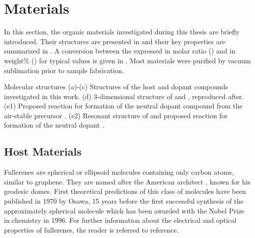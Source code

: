 \newpage
\section{Materials}\label{sec:Mat}
In this section, the organic materials investigated during this thesis are briefly introduced. Their structures are presented in  and their key properties are summarized in . A conversion between the \CLong expressed in molar ratio (\mr{}) and in weight\% (\wt{}) for typical values is given in . Most materials were purified by vacuum sublimation prior to sample fabrication.

{Molecular structures}
{(a)-(c) Structures of the host and dopant compounds investigated in this work. (d) 3-dimensional structure of \CrPd and \WPd, reproduced after\cite{Cotton2003}. (e1) Proposed reaction for formation of the neutral dopant compound \meodmbi from the air-stable precursor \meodmbiI. (e2) Resonant structure of \dmbi and proposed reaction for formation of the neutral dopant \OHdmbi.
}

\subsection{Host Materials}
\label{sec:MatHosts}\label{sec:MatC60}\label{sec:MatMeO}

Fullerenes are spherical or ellipsoid molecules containing only carbon atoms, similar to graphene. They are named after the American architect
, known for his geodesic domes.
%
First theoretical predictions of this class of molecules have been published in 1970 by Osawa\cite{Osawa1970,Osawa1993}, 15 years before the first successful synthesis of the approximately spherical \CS molecule\cite{Kroto1985} which has been awarded with the Nobel Prize in chemistry in 1996. For further information about the electrical and optical properties of fullerenes, the reader is referred to reference\cite{Makarova2001}.

